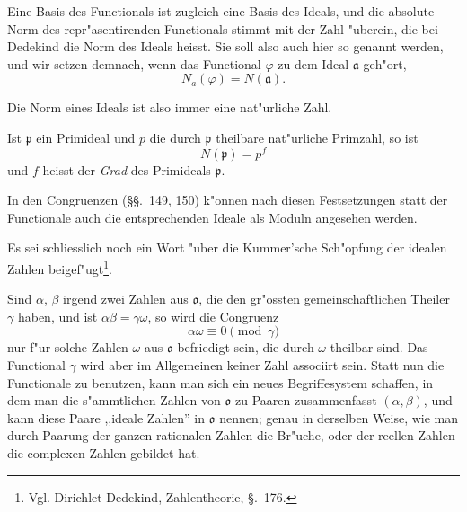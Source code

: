 \documentclass[12pt,a4paper]{article}
\theoremstyle{definition}
\begin{document}
Eine Basis des Functionals ist zugleich eine Basis des Ideals, und die absolute Norm des repr"asentirenden Functionals stimmt mit der Zahl "uberein, die bei Dedekind die Norm des Ideals heisst. Sie soll also auch hier so genannt werden, und wir setzen demnach, wenn das Functional $\varphi$ zu dem Ideal $\mathfrak{a}$ geh"ort,
\begin{equation}
N_a(\varphi) = N(\mathfrak{a}).
\end{equation}

Die Norm eines Ideals ist also immer eine nat"urliche Zahl.

Ist $\mathfrak{p}$ ein Primideal und $p$ die durch $\mathfrak{p}$ theilbare nat"urliche Primzahl, so ist
\begin{equation}
N(\mathfrak{p}) = p^f
\end{equation}
und $f$ heisst der \emph{Grad} des Primideals $\mathfrak{p}$.

In den Congruenzen (\S\S.~149, 150) k"onnen nach diesen Festsetzungen statt der Functionale auch die entsprechenden Ideale als Moduln angesehen werden.

Es sei schliesslich noch ein Wort "uber die Kummer'sche Sch"opfung der idealen Zahlen beigef"ugt\footnote{Vgl. Dirichlet-Dedekind, Zahlentheorie, \S.~176.}.

Sind $\alpha$, $\beta$ irgend zwei Zahlen aus $\mathfrak{o}$, die den gr"ossten gemeinschaftlichen Theiler $\gamma$ haben, und ist $\alpha\beta = \gamma\omega$, so wird die Congruenz
\begin{equation}
\alpha\omega \equiv 0 \pmod{\gamma}
\end{equation}
nur f"ur solche Zahlen $\omega$ aus $\mathfrak{o}$ befriedigt sein, die durch $\omega$ theilbar sind. Das Functional $\gamma$ wird aber im Allgemeinen keiner Zahl associirt sein. Statt nun die Functionale zu benutzen, kann man sich ein neues Begriffesystem schaffen, in dem man die s"ammtlichen Zahlen von $\mathfrak{o}$ zu Paaren zusammenfasst $(\alpha, \beta)$, und kann diese Paare ,,ideale Zahlen'' in $\mathfrak{o}$ nennen; genau in derselben Weise, wie man durch Paarung der ganzen rationalen Zahlen die Br"uche, oder der reellen Zahlen die complexen Zahlen gebildet hat.
\end{document}
